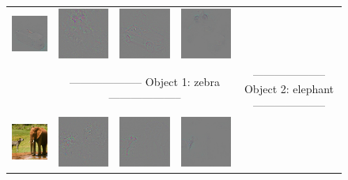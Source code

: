 \begin{figure}
\begin{center}
\begin{tabular}{ccccccc}
\includegraphics[width=0.14\linewidth,height=0.115\linewidth]{figs/examples/googlenet/soft/bic-car2_diff_818} &
\includegraphics[width=0.14\linewidth,height=0.115\linewidth]{figs/examples/googlenet/oxford/bic-car2_diff_672} &
\includegraphics[width=0.14\linewidth,height=0.115\linewidth]{figs/examples/googlenet/deconv/bic-car2_diff_672} &
\includegraphics[width=0.14\linewidth,height=0.115\linewidth]{figs/examples/googlenet/soft/bic-car2_diff_672} \\
& \multicolumn{3}{c}{\small -------------------- Object 1: zebra --------------------} & \multicolumn{3}{c}{\small -------------------- Object 2: elephant --------------------} \\
\vspace{-2.5pt}
\includegraphics[width=0.14\linewidth,height=0.115\linewidth]{figs/examples/googlenet/oxford/zeb-ele1} &
\includegraphics[width=0.14\linewidth,height=0.115\linewidth]{figs/examples/googlenet/oxford/zeb-ele1_diff_341} &
\includegraphics[width=0.14\linewidth,height=0.115\linewidth]{figs/examples/googlenet/deconv/zeb-ele1_diff_341} &
\includegraphics[width=0.14\linewidth,height=0.115\linewidth]{figs/examples/googlenet/soft/zeb-ele1_diff_341} &

\end{tabular}
\end{center}
\end{figure}
